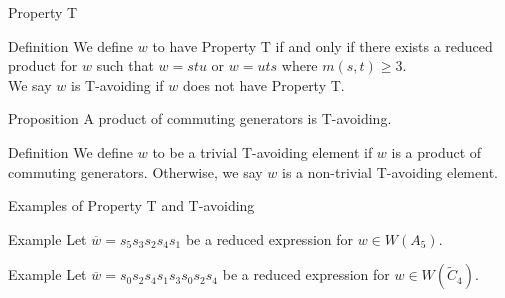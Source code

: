 \documentclass{beamer}
\newcommand{\w}{\overline{w}}
\newcommand{\C}{\widetilde{C}}
\newcommand\heapblock[4]{\fill[fill=#4, fill opacity=0.35, draw=#4, line width=1.1pt, rounded corners,shift={(\xxaxis:#1)},shift={(\yyaxis:#2)}] (-1,-1) rectangle (1,1);\node at (#1,#2) {\footnotesize $#3$};}
\newcommand\xxaxis{0}
\newcommand\yyaxis{90}
\begin{document}

\begin{frame}{Property T}
	\begin{block}{Definition}
	We define $w$ to have \alert{Property T} if and only if there exists a reduced product for $w$ such that $w=stu$ or $w=uts$ where $m(s,t) \geq 3$.\\ \pause 
	\vspace{1em}
	We say $w$ is \alert{T-avoiding} if $w$ does not have Property T.
	\end{block}
\pause
\begin{block}{Proposition}
A product of commuting generators is T-avoiding.	
\end{block}
\pause
\begin{block}{Definition}
	We define $w$ to be a \alert{trivial T-avoiding} element if $w$ is a product of commuting generators. Otherwise, we say $w$ is a \alert{non-trivial T-avoiding} element.
\end{block}

\end{frame}




\begin{frame}{Examples of Property T and T-avoiding}

\begin{block}{Example}
Let $\w=s_5s_3s_2s_4s_1$ be a reduced expression for $w \in W(A_5)$. 
\pause
\begin{figure}
\end{figure}
\end{block}

\pause

\begin{block}{Example}
Let $\w=s_0s_2s_4s_1s_3s_0s_2s_4$ be a reduced expression for $w \in W(\C_4)$.
\begin{figure}
\end{figure}
\end{block}

\end{frame}
\end{document}
